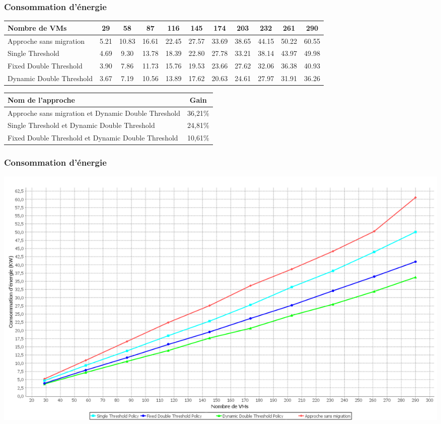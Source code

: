 \documentclass[xcolor=dvipsnames]{beamer}
\begin{document}
\begin{frame}
\frametitle{Consommation d’énergie}
\begin{center}
{\tiny  \begin{tabular}{|p{3cm}|c|c|c|c|c|c|c|c|c|c|}
\hline
      \centering     Nombre de VMs &  29& 58& 87& 116& 145& 174& 203& 232& 261& 290\\
\hline
     \centering       Approche sans migration &  5.21& 10.83& 16.61& 22.45& 27.57& 33.69& 38.65& 44.15& 50.22& 60.55\\
\hline
      \centering      Single Threshold &  4.69& 9.30& 13.78& 18.39& 22.80& 27.78& 33.21& 38.14& 43.97& 49.98\\
\hline
      \centering      \color{red}Fixed Double Threshold &  3.90& 7.86& 11.73& 15.76& 19.53& 23.66& 27.62& 32.06& 36.38& 40.93\\
\hline
      \centering    \color{red} Dynamic Double Threshold &  3.67& 7.19& 10.56& 13.89& 17.62& 20.63& 24.61& 27.97& 31.91& 36.26\\
\hline
\end{tabular}}
\end{center}



\begin{center}
{\tiny   \begin{tabular}{|p{3.5cm}|c|}
\hline
      \centering      Nom de l’approche &  Gain\\
\hline
     \centering       Approche sans migration et Dynamic Double Threshold &  36,21\%\\
\hline
      \centering      Single Threshold et Dynamic Double Threshold&  24,81\%\\
\hline
      \centering      Fixed Double Threshold et Dynamic Double Threshold&  10,61\%\\
\hline
\end{tabular}}

\end{center}
\end{frame}

\begin{frame}
\frametitle{Consommation d’énergie}
\begin{center}
\includegraphics[scale=0.25]{sh1.png}
\end{center}
\end{frame}
\end{document}
